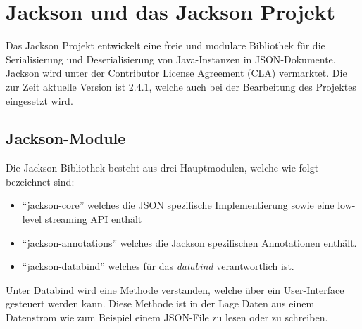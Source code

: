 \section{Jackson und das Jackson Projekt}
Das Jackson Projekt entwickelt eine freie und modulare Bibliothek f\"ur die Serialisierung und Deserialisierung von Java-Instanzen in \ac{JSON}-Dokumente. Jackson wird unter der Contributor License Agreement (CLA) vermarktet. Die zur Zeit aktuelle Version ist 2.4.1, welche auch bei der Bearbeitung des Projektes eingesetzt wird.

\subsection{Jackson-Module}
Die Jackson-Bibliothek besteht aus drei Hauptmodulen, welche wie folgt bezeichnet sind:
\begin{itemize}
 \item "`jackson-core"' welches die JSON spezifische Implementierung sowie eine low-level streaming API enth\"alt
 \item "`jackson-annotations"' welches die Jackson spezifischen Annotationen enth\"alt.
 \item "`jackson-databind"' welches f\"ur das \textit{databind} verantwortlich ist.
\end{itemize}
Unter Databind wird eine Methode verstanden, welche \"uber ein User-Interface gesteuert werden kann.
Diese Methode ist in der Lage Daten aus einem Datenstrom wie zum Beispiel einem JSON-File zu lesen oder zu schreiben.
